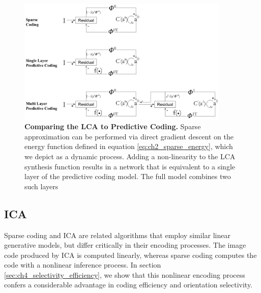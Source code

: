 \begin{figure}[H]
    \centering
    \includegraphics[width=0.9\textwidth]{./figures/lca_pc_model_comparisons.png}
    \caption{\textbf{Comparing the LCA to Predictive Coding.} Sparse approximation can be performed via direct gradient descent on the energy function defined in equation \eqref{eq:ch2_sparse_energy}, which we depict as a dynamic process. Adding a non-linearity to the LCA synthesis function results in a network that is equivalent to a single layer of the predictive coding model. The full model combines two such layers \parencite{rao1999predictive}}
    \label{fig:ch2_lca_pc_comp}
\end{figure}




\subsection{ICA}
Sparse coding and ICA are related algorithms that employ similar linear generative models, but differ critically in their encoding processes. The image code produced by ICA is computed linearly, whereas sparse coding computes the code with a nonlinear inference process. In section \ref{sec:ch4_selectivity_efficiency}, we show that this nonlinear encoding process confers a considerable advantage in coding efficiency and orientation selectivity.

